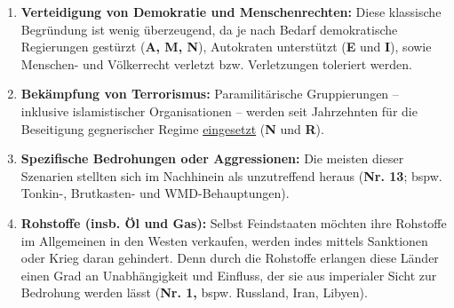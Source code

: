 \begin{enumerate}
\def\labelenumi{\arabic{enumi}.}
\tightlist
\item
  \textbf{Verteidigung von Demokratie und Menschenrechten:} Diese
  klassische Begründung ist wenig überzeugend, da je nach Bedarf
  demokratische Regierungen gestürzt (\textbf{A, M, N}), Autokraten
  unterstützt (\textbf{E} und \textbf{I}), sowie Menschen- und
  Völkerrecht verletzt bzw. Verletzungen toleriert werden.
\item
  \textbf{Bekämpfung von Terrorismus:} Paramilitärische Gruppierungen --
  inklusive islamistischer Organisationen -- werden seit Jahrzehnten für
  die Beseitigung gegnerischer Regime
  \href{https://de.wikipedia.org/wiki/Operation_Cyclone}{eingesetzt}
  (\textbf{N} und \textbf{R}).
\item
  \textbf{Spezifische Bedrohungen oder Aggressionen:} Die meisten dieser
  Szenarien stellten sich im Nachhinein als unzutreffend heraus
  (\textbf{Nr. 13}; bspw. Tonkin-, Brutkasten- und WMD-Behauptungen).
\item
  \textbf{Rohstoffe (insb. Öl und Gas):} Selbst Feindstaaten möchten
  ihre Rohstoffe im Allgemeinen in den Westen verkaufen, werden indes
  mittels Sanktionen oder Krieg daran gehindert. Denn durch die
  Rohstoffe erlangen diese Länder einen Grad an Unabhängigkeit und
  Einfluss, der sie aus imperialer Sicht zur Bedrohung werden lässt
  (\textbf{Nr. 1,} bspw. Russland, Iran, Libyen).


\end{enumerate}
